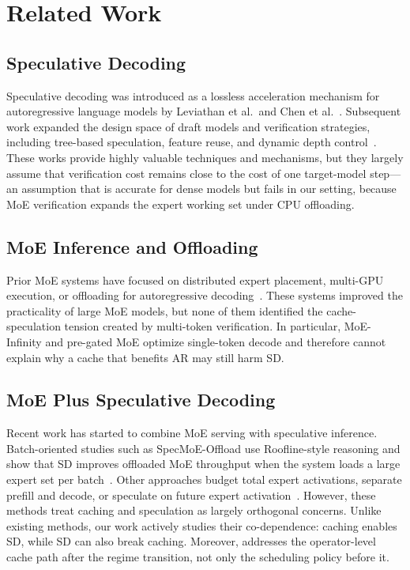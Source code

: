 \section{Related Work}
\label{sec:related}

\subsection{Speculative Decoding}

Speculative decoding was introduced as a lossless acceleration mechanism for autoregressive language models by Leviathan et al.~and Chen et al.~\cite{leviathan2023fast,chen2023accelerating}. Subsequent work expanded the design space of draft models and verification strategies, including tree-based speculation, feature reuse, and dynamic depth control~\cite{miao2024specinfer,li2024eagle,li2024eagle2,li2025eagle3}. These works provide highly valuable techniques and mechanisms, but they largely assume that verification cost remains close to the cost of one target-model step---an assumption that is accurate for dense models but fails in our setting, because MoE verification expands the expert working set under CPU offloading.

\subsection{MoE Inference and Offloading}

Prior MoE systems have focused on distributed expert placement, multi-GPU execution, or offloading for autoregressive decoding~\cite{rajbhandari2022deepspeed,hwang2023tutel,eliseev2023mixtral,xue2024moeinfinity,hwang2023pregated}. These systems improved the practicality of large MoE models, but none of them identified the cache-speculation tension created by multi-token verification. In particular, MoE-Infinity and pre-gated MoE optimize single-token decode and therefore cannot explain why a cache that benefits AR may still harm SD.

\subsection{MoE Plus Speculative Decoding}

Recent work has started to combine MoE serving with speculative inference. Batch-oriented studies such as SpecMoE-Offload use Roofline-style reasoning and show that SD improves offloaded MoE throughput when the system loads a large expert set per batch~\cite{liu2025specmoeoffload}. Other approaches budget total expert activations, separate prefill and decode, or speculate on future expert activation~\cite{yi2025moespec,jin2024spmoe,park2025moespac}. However, these methods treat caching and speculation as largely orthogonal concerns. Unlike existing methods, our work actively studies their co-dependence: caching enables SD, while SD can also break caching. Moreover, \sysname addresses the operator-level cache path after the regime transition, not only the scheduling policy before it.

